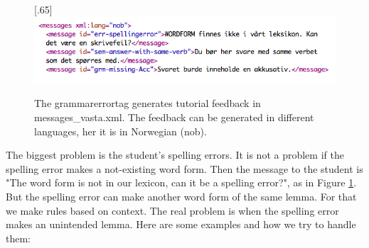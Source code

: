 \documentclass[a4paper,12pt]{article}
\begin{document}
\begin{figure}[htbp]
\begin{center}
\scalebox{.65}[.65]{\includegraphics{img/messages_vasta.png}}
\caption{The grammarerrortag generates tutorial feedback in messages\_vasta.xml. The feedback can be generated in different languages, her it is in Norwegian (nob).}
\label{messv}
\end{center}
\end{figure}

\newpage
The biggest problem is the student's spelling errors. It is not a problem if the spelling error makes a not-existing word form. Then the message to the student is  "The word form is not in our lexicon, can it be a spelling error?", as in Figure \ref{messv}. But the spelling error can make another word form of the same lemma. For that we make rules based on context. The real problem is when the spelling error makes an unintended lemma. Here are some examples and how we try to handle them:\\
\end{document}
